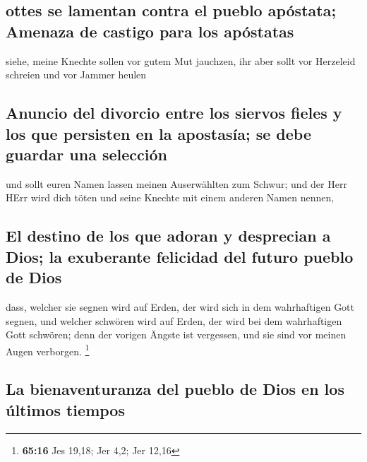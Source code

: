 \hypertarget{ottes-se-lamentan-contra-el-pueblo-apuxf3stata-amenaza-de-castigo-para-los-apuxf3statas}{%
\subsection{ottes se lamentan contra el pueblo apóstata; Amenaza de
castigo para los
apóstatas}\label{ottes-se-lamentan-contra-el-pueblo-apuxf3stata-amenaza-de-castigo-para-los-apuxf3statas}}

 siehe, meine Knechte sollen vor gutem Mut jauchzen, ihr
aber sollt vor Herzeleid schreien und vor Jammer heulen

\hypertarget{anuncio-del-divorcio-entre-los-siervos-fieles-y-los-que-persisten-en-la-apostasuxeda-se-debe-guardar-una-selecciuxf3n}{%
\subsection{Anuncio del divorcio entre los siervos fieles y los que
persisten en la apostasía; se debe guardar una
selección}\label{anuncio-del-divorcio-entre-los-siervos-fieles-y-los-que-persisten-en-la-apostasuxeda-se-debe-guardar-una-selecciuxf3n}}

 und sollt euren Namen lassen meinen Auserwählten zum
Schwur; und der Herr HErr wird dich töten und seine Knechte mit einem
anderen Namen nennen,

\hypertarget{el-destino-de-los-que-adoran-y-desprecian-a-dios-la-exuberante-felicidad-del-futuro-pueblo-de-dios}{%
\subsection{El destino de los que adoran y desprecian a Dios; la
exuberante felicidad del futuro pueblo de
Dios}\label{el-destino-de-los-que-adoran-y-desprecian-a-dios-la-exuberante-felicidad-del-futuro-pueblo-de-dios}}

 dass, welcher sie segnen wird auf Erden, der wird sich
in dem wahrhaftigen Gott segnen, und welcher schwören wird auf Erden,
der wird bei dem wahrhaftigen Gott schwören; denn der vorigen Ängste ist
vergessen, und sie sind vor meinen Augen verborgen. \footnote{\textbf{65:16}
  Jes 19,18; Jer 4,2; Jer 12,16}

\hypertarget{la-bienaventuranza-del-pueblo-de-dios-en-los-uxfaltimos-tiempos}{%
\subsection{La bienaventuranza del pueblo de Dios en los últimos
tiempos}\label{la-bienaventuranza-del-pueblo-de-dios-en-los-uxfaltimos-tiempos}}

